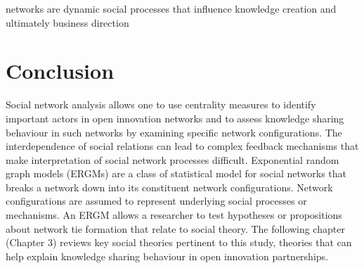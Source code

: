 networks are dynamic social processes that influence knowledge creation and ultimately business direction \citep{sloane and o'reilly 2013}








\section{Conclusion}

Social network analysis allows one to use centrality measures to identify important actors in open innovation networks and to assess knowledge sharing behaviour in such networks by examining specific network configurations. The interdependence of social relations can lead to complex feedback mechanisms that make interpretation of social network processes difficult. Exponential random graph models (ERGMs) are a class of statistical model for social networks that breaks a network down into its constituent network configurations. Network configurations are assumed to represent underlying social processes or mechanisms. An ERGM allows a researcher to test hypotheses or propositions about network tie formation that relate to social theory. The following chapter (Chapter 3) reviews key social theories pertinent to this study, theories that can help explain knowledge sharing behaviour in open innovation partnerships. 
